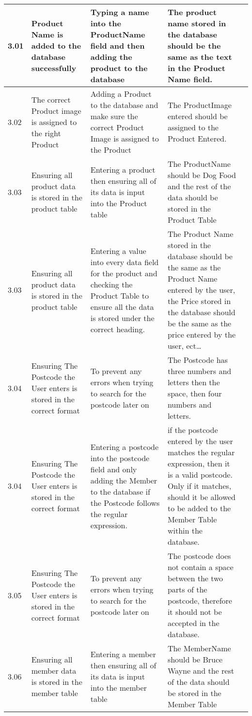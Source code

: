 \begin{flushleft}
\begin{longtable}{|p{1cm}|p{2.5cm}|p{2.5cm}|p{2cm}|p{2cm}|}
	\rowcolor{light-grey}3.01 & Product Name is added to the database successfully & Typing a name into the ProductName field and then adding the product to the database & The product name stored in the database should be the same as the text in the Product Name field.& \\ \hline
	3.02 & The correct Product image is assigned to the right Product & Adding a Product to the database and make sure the correct Product Image is assigned to the Product & The ProductImage entered should be assigned to the Product Entered. & \\ \hline
	\rowcolor{dark-grey}3.03 & Ensuring all product data is stored in the product table & Entering a product then ensuring all of its data is input into the Product table  & The ProductName should be Dog Food and the rest of the data should be stored in the Product Table & \\ \hline
	\rowcolor{light-grey}3.03 & Ensuring all product data is stored in the product table & Entering a value into every data field for the product and checking the Product Table to ensure all the data is stored under the correct heading.  & The Product Name stored in the database should be the same as the Product Name entered by the user, the Price stored in the database should be the same as the price entered by the user, ect\ldots & \\ \hline
	\rowcolor{dark-grey}3.04 & Ensuring The Postcode the User enters is stored in the correct format  & To prevent any errors when trying to search for the postcode later on  & The Postcode has three numbers and letters then the space, then four numbers and letters. & \\ \hline
	\rowcolor{light-grey}3.04 & Ensuring The Postcode the User enters is stored in the correct format  & Entering a postcode into the postcode field and only adding the Member to the database if the Postcode follows the regular expression. &if the postcode entered by the user matches the regular expression, then it is a valid postcode. Only if it matches, should it be allowed to be added to the Member Table within the database.& \\ \hline
	\rowcolor{dark-grey}3.05 & Ensuring The Postcode the User enters is stored in the correct format  & To prevent any errors when trying to search for the postcode later on  & The postcode does not contain a space between the two parts of the postcode, therefore it should not be accepted in the database. & \\ \hline
	\rowcolor{dark-grey}3.06 & Ensuring all member data is stored in the member table & Entering a member then ensuring all of its data is input into the member table  & The MemberName should be Bruce Wayne  and the rest of the data should be stored in the Member Table & \\ \hline

\end{longtable}
\end{flushleft}
